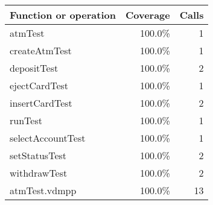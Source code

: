 \documentclass[a4paper]{article}
\begin{document}
\begin{longtable}{|l|r|r|}
\hline
Function or operation & Coverage & Calls \\
\hline
\hline
atmTest & 100.0\% & 1 \\
\hline
createAtmTest & 100.0\% & 1 \\
\hline
depositTest & 100.0\% & 2 \\
\hline
ejectCardTest & 100.0\% & 1 \\
\hline
insertCardTest & 100.0\% & 2 \\
\hline
runTest & 100.0\% & 1 \\
\hline
selectAccountTest & 100.0\% & 1 \\
\hline
setStatusTest & 100.0\% & 2 \\
\hline
withdrawTest & 100.0\% & 2 \\
\hline
\hline
atmTest.vdmpp & 100.0\% & 13 \\
\hline
\end{longtable}
\end{document}
